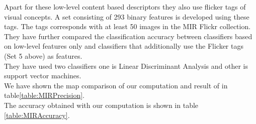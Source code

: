 Apart for these low-level content based descriptors they also use flicker tags of visual concepts.  A set consisting of 293 binary features is developed using these tags. The tags corresponds with at least 50 images in the MIR Flickr collection.\\
They have further compared the classification accuracy between classifiers based on low-level features only and classifiers that additionally use the Flicker tags (Set 5 above) as features.\\
They have used two classifiers one is Linear Discriminant Analysis and other is support vector machines. \\

We have shown the map comparison of our computation and result of \cite{MIRresults}in table\ref{table:MIRPrecision}.\\
The accuracy obtained with our computation is shown in table \ref{table:MIRAccuracy}.\\


